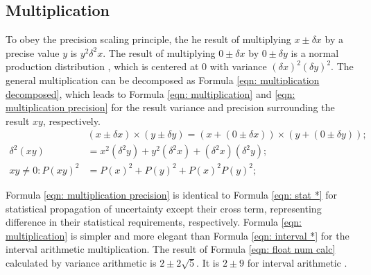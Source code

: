 \documentclass[twoside]{article}
\numberwithin{equation}{section}
\newcommand{\eqspace}{\;\;\;}
\begin{document}
\subsection{Multiplication}

To obey the precision scaling principle, the he result of multiplying $x \pm \delta x$ by a precise value $y$ is $ y^2 \delta^2 x$.
The result of multiplying $0 \pm \delta x$ by $0 \pm \delta y$ is a normal production distribution \cite{Probability_Statistics}, which is centered at 0 with variance $(\delta x)^2 (\delta y)^2$.
The general multiplication can be decomposed as Formula \eqref{eqn: multiplication decomposed}, which leads to Formula \eqref{eqn: multiplication} and \eqref{eqn: multiplication precision} for the result variance and precision surrounding the result $xy$, respectively.
\begin{align}
\label{eqn: multiplication decomposed}
& (x \pm \delta x) \times (y \pm \delta y) = (x + (0 \pm \delta x)) \times (y + (0 \pm \delta y)); \\
\label{eqn: multiplication}
\delta^2 (x y) &= x^2 (\delta^2 y) + y^2 (\delta^2 x) + (\delta^2 x)(\delta^2 y); \\
\label{eqn: multiplication precision}
xy \neq 0: P(x y)^2 &= P(x)^2 + P(y)^2 + P(x)^2 P(y)^2;
\end{align}

Formula \eqref{eqn: multiplication precision} is identical to Formula \eqref{eqn: stat *} for statistical propagation of uncertainty except their cross term, representing difference in their statistical requirements, respectively.  
Formula \eqref{eqn: multiplication} is simpler and more elegant than Formula \eqref{eqn: interval *} for the interval arithmetic multiplication.  
The result of Formula \eqref{eqn: float num calc} calculated by variance arithmetic is $2 \pm 2\sqrt{5}$.
It is $2 \pm 9$ for interval arithmetic \cite{Worst_Case_Error_Bounds}.
\end{document}
